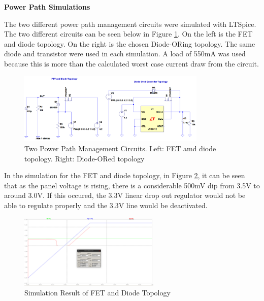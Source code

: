 \documentclass{article}
\numberwithin{figure}{section}
\numberwithin{equation}{section}
\begin{document}
{\newpage
\textbf{Power Path Simulations}

The two different power path management circuits were simulated with LTSpice. The two different circuits can be seen below in Figure \ref{fig:doredsim}. On the left is the FET and diode topology. On the right is the chosen Diode-ORing topology. The same diode and transistor were used in each simulation. A load of 550mA was used because this is more than the calculated worst case current draw from the circuit.

\begin{figure}[H]
	\centering
	\includegraphics[width=0.8\textwidth]{DiodeORSIM}
	\caption{Two Power Path Management Circuits. Left: FET amd diode topology. Right: Diode-ORed topology}
	\label{fig:doredsim}
\end{figure}

In the simulation for the FET and diode topology, in Figure \ref{fig:doredsimres1}, it can be seen that as the panel voltage is rising, there is a considerable 500mV dip from 3.5V to around 3.0V. If this occured, the 3.3V linear drop out regulator would not be able to regulate properly and the 3.3V line would be deactivated.
\begin{figure}[H]
	\centering
	\includegraphics[width=0.6\textwidth]{DiodeORres1}
	\caption{Simulation Result of FET and Diode Topology}
	\label{fig:doredsimres1}
\end{figure}

}
\end{document}
